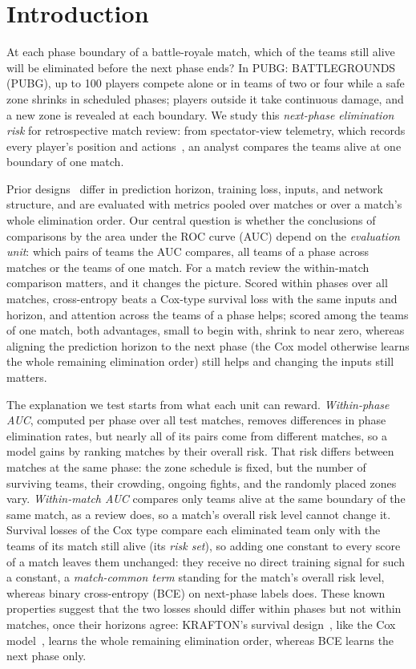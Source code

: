 \documentclass[sigconf,anonymous]{acmart}
\begin{document}
\section{Introduction}
\label{sec:introduction}
At each phase boundary of a battle-royale match, which of the teams still alive will be eliminated before the next phase ends? In PUBG: BATTLEGROUNDS (PUBG), up to 100 players compete alone or in teams of two or four while a safe zone shrinks in scheduled phases; players outside it take continuous damage, and a new zone is revealed at each boundary. We study this \emph{next-phase elimination risk} for retrospective match review: from spectator-view telemetry, which records every player's position and actions~\cite{PUBGAPI}, an analyst compares the teams alive at one boundary of one match.

Prior designs~\cite{Sagong25a,KRAFTON} differ in prediction horizon, training loss, inputs, and network structure, and are evaluated with metrics pooled over matches or over a match's whole elimination order. Our central question is whether the conclusions of comparisons by the area under the ROC curve (AUC) depend on the \emph{evaluation unit}: which pairs of teams the AUC compares, all teams of a phase across matches or the teams of one match. For a match review the within-match comparison matters, and it changes the picture. Scored within phases over all matches, cross-entropy beats a Cox-type survival loss with the same inputs and horizon, and attention across the teams of a phase helps; scored among the teams of one match, both advantages, small to begin with, shrink to near zero, whereas aligning the prediction horizon to the next phase (the Cox model otherwise learns the whole remaining elimination order) still helps and changing the inputs still matters.

The explanation we test starts from what each unit can reward. \emph{Within-phase AUC}, computed per phase over all test matches, removes differences in phase elimination rates, but nearly all of its pairs come from different matches, so a model gains by ranking matches by their overall risk. That risk differs between matches at the same phase: the zone schedule is fixed, but the number of surviving teams, their crowding, ongoing fights, and the randomly placed zones vary. \emph{Within-match AUC} compares only teams alive at the same boundary of the same match, as a review does, so a match's overall risk level cannot change it. Survival losses of the Cox type compare each eliminated team only with the teams of its match still alive (its \emph{risk set}), so adding one constant to every score of a match leaves them unchanged: they receive no direct training signal for such a constant, a \emph{match-common term} standing for the match's overall risk level, whereas binary cross-entropy (BCE) on next-phase labels does. These known properties suggest that the two losses should differ within phases but not within matches, once their horizons agree: KRAFTON's survival design~\cite{KRAFTON}, like the Cox model~\cite{Cox72}, learns the whole remaining elimination order, whereas BCE learns the next phase only.
\end{document}
